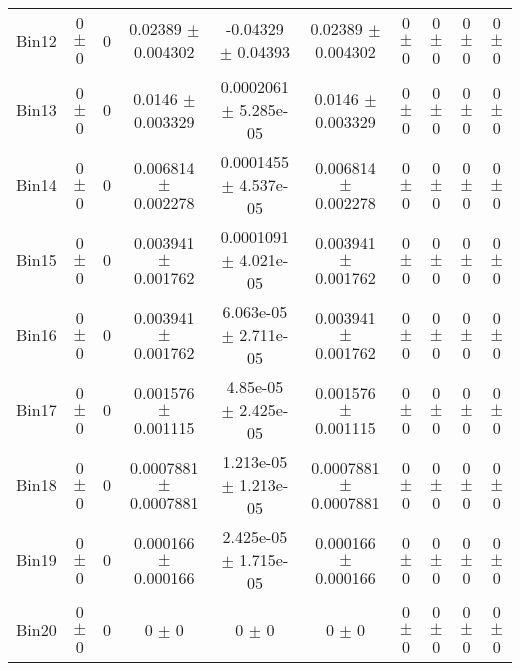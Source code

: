 \begin{tabular}{@{\extracolsep{4pt}}lccccccccc@{}}
     Bin12 & 0 $\pm$ 0 & 0 & 0.02389 $\pm$ 0.004302 & -0.04329 $\pm$ 0.04393 & 0.02389 $\pm$ 0.004302 & 0 $\pm$ 0 & 0 $\pm$ 0 & 0 $\pm$ 0 & 0 $\pm$ 0 \\ 
     Bin13 & 0 $\pm$ 0 & 0 & 0.0146 $\pm$ 0.003329 & 0.0002061 $\pm$ 5.285e-05 & 0.0146 $\pm$ 0.003329 & 0 $\pm$ 0 & 0 $\pm$ 0 & 0 $\pm$ 0 & 0 $\pm$ 0 \\ 
     Bin14 & 0 $\pm$ 0 & 0 & 0.006814 $\pm$ 0.002278 & 0.0001455 $\pm$ 4.537e-05 & 0.006814 $\pm$ 0.002278 & 0 $\pm$ 0 & 0 $\pm$ 0 & 0 $\pm$ 0 & 0 $\pm$ 0 \\ 
     Bin15 & 0 $\pm$ 0 & 0 & 0.003941 $\pm$ 0.001762 & 0.0001091 $\pm$ 4.021e-05 & 0.003941 $\pm$ 0.001762 & 0 $\pm$ 0 & 0 $\pm$ 0 & 0 $\pm$ 0 & 0 $\pm$ 0 \\ 
     Bin16 & 0 $\pm$ 0 & 0 & 0.003941 $\pm$ 0.001762 & 6.063e-05 $\pm$ 2.711e-05 & 0.003941 $\pm$ 0.001762 & 0 $\pm$ 0 & 0 $\pm$ 0 & 0 $\pm$ 0 & 0 $\pm$ 0 \\ 
     Bin17 & 0 $\pm$ 0 & 0 & 0.001576 $\pm$ 0.001115 & 4.85e-05 $\pm$ 2.425e-05 & 0.001576 $\pm$ 0.001115 & 0 $\pm$ 0 & 0 $\pm$ 0 & 0 $\pm$ 0 & 0 $\pm$ 0 \\ 
     Bin18 & 0 $\pm$ 0 & 0 & 0.0007881 $\pm$ 0.0007881 & 1.213e-05 $\pm$ 1.213e-05 & 0.0007881 $\pm$ 0.0007881 & 0 $\pm$ 0 & 0 $\pm$ 0 & 0 $\pm$ 0 & 0 $\pm$ 0 \\ 
     Bin19 & 0 $\pm$ 0 & 0 & 0.000166 $\pm$ 0.000166 & 2.425e-05 $\pm$ 1.715e-05 & 0.000166 $\pm$ 0.000166 & 0 $\pm$ 0 & 0 $\pm$ 0 & 0 $\pm$ 0 & 0 $\pm$ 0 \\ 
     Bin20 & 0 $\pm$ 0 & 0 & 0 $\pm$ 0 & 0 $\pm$ 0 & 0 $\pm$ 0 & 0 $\pm$ 0 & 0 $\pm$ 0 & 0 $\pm$ 0 & 0 $\pm$ 0 \\ 
\hline\hline
  \end{tabular}
